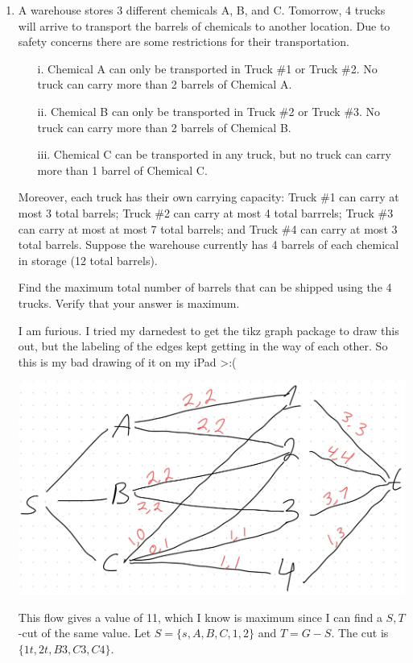 \documentclass[12pt]{article}
\begin{document}
\begin{enumerate}
\medskip 
\item A warehouse stores 3 different chemicals A, B, and C. Tomorrow, 4 trucks will arrive to transport the barrels of chemicals to another location. Due to safety concerns there are some restrictions for their transportation.
\begin{enumerate}
\item[i.] Chemical A can only be transported in Truck \#1 or Truck \#2. No truck can carry more than 2 barrels of Chemical A. 
\item[ii.] Chemical B can only be transported in Truck \#2 or Truck \#3. No truck can carry more than 2 barrels of Chemical B. 
\item[iii.] Chemical C can be transported in any truck, but no truck can carry more than 1 barrel of Chemical C. 
\end{enumerate}

Moreover, each truck has their own carrying capacity: Truck \#1 can carry at most 3 total barrels; Truck \#2 can carry at most 4 total barrrels; Truck \#3 can carry at most at most 7 total barrels; and Truck \#4 can carry at most 3 total barrels. Suppose the warehouse currently has 4 barrels of each chemical in storage (12 total barrels). 

Find the maximum total number of barrels that can be shipped using the 4 trucks. Verify that your answer is maximum.\m


I am furious. I tried my darnedest to get the tikz graph package to draw this out, but the labeling of the edges kept getting in the way of each other. So this is my bad drawing of it on my iPad >:(
\begin{center}
	\includegraphics[scale=0.75]{7_5.png}
\end{center}
This flow gives a value of 11, which I know is maximum since I can find a $S,T$-cut of the same value. Let $S=\{s,A,B,C,1,2\}$ and $T=G-S$. The cut is $\{1t,2t,B3,C3,C4\}$.

\end{enumerate}
\end{document}
